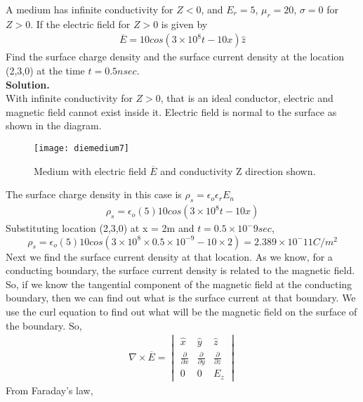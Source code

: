   \begin{exmp}
  	A medium has infinite conductivity for $Z<0$, and $E_r=5$, $\mu_r = 20$, $\sigma = 0$ for $Z>0$. If the electric field for $Z>0$ is given by 
  	\begin{align*}
  	\overline{E} = 10cos(3\times 10^8t - 10x)\hat{z}
  	\end{align*}
  	Find the surface charge density and the surface current density at the location (2,3,0) at the time $t = 0.5nsec$.\\
  	\textbf{Solution.}\\
  	With infinite conductivity for $Z>0$, that is an ideal conductor, electric and magnetic field cannot exist inside it. Electric field is normal to the surface as shown in the diagram.
  	\begin{figure}[h]
  		\centering
  		\texttt{[image: diemedium7]}
  		\caption{Medium with electric field $\overline{E}$ and conductivity Z direction shown.}
  	\end{figure}
  The surface charge density in this case is $\rho_s = \epsilon_o\epsilon_rE_n$
  \begin{align*}
  \rho_s = \epsilon_o(5)10cos(3\times10^8t - 10x)
  \end{align*}
  Substituting location (2,3,0) at x = 2m and $t = 0.5\times 10^-9sec$,
  \begin{dmath*}
  \rho_s = \epsilon_o(5)10cos(3\times 10^8\times 0.5\times10^{-9} - 10\times 2) = 2.389\times 10^-11 C/m^2
  \end{dmath*}
  Next we find the surface current density at that location. As we know, for a conducting boundary, the surface current density is related to the magnetic field. \\
  So, if we know the tangential component of the magnetic field at the conducting boundary, then we can find out what is the surface current at that boundary. We use the curl equation to find out what will be the magnetic field on the surface of the boundary. So,
  \begin{align*}
  \nabla\times \overline{E} = \begin{vmatrix}
  \hat{x} &\hat{y} &\hat{z}\\
  \frac{\partial}{\partial x} & \frac{\partial}{\partial y} & \frac{\partial}{\partial z} \\
  0 &0 &E_z
  \end{vmatrix}
  \end{align*}
  From Faraday's law,
  \begin{align*}

\end{align*}
\end{exmp}
